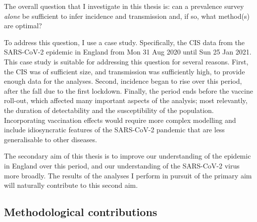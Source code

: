 \documentclass[thesis.tex]{subfiles}
\begin{document}
The overall question that I investigate in this thesis is: can a prevalence survey \emph{alone} be sufficient to infer incidence and transmission and, if so, what method(s) are optimal?

To address this question, I use a case study.
Specifically, the CIS data from the SARS-CoV-2 epidemic in England from Mon 31 Aug 2020 until Sun 25 Jan 2021.
This case study is suitable for addressing this question for several reasons.
First, the CIS was of sufficient size, and transmission was sufficiently high, to provide enough data for the analyses.
Second, incidence began to rise over this period, after the fall due to the first lockdown.
Finally, the period ends before the vaccine roll-out, which  affected many important aspects of the analysis; most relevantly, the duration of detectability and the susceptibility of the population.
Incorporating vaccination effects would require more complex modelling and include idiosyncratic features of the SARS-CoV-2 pandemic that are less generalisable to other diseases.

The secondary aim of this thesis is to improve our understanding of the epidemic in England over this period, and our understanding of the SARS-CoV-2 virus more broadly.
The results of the analyses I perform in pursuit of the primary aim will naturally contribute to this second aim.

\subsection{Methodological contributions}
\end{document}
